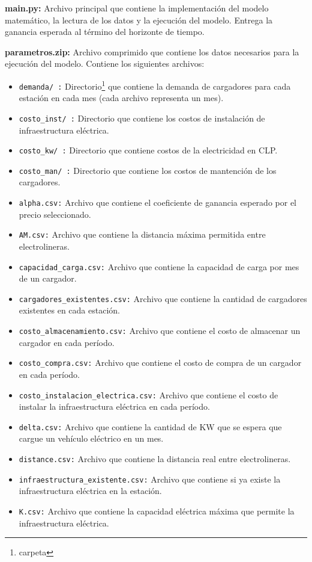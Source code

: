 \documentclass[letterpaper]{article}
\begin{document}
\begin{flushleft}
	\textbf{main.py:} Archivo principal que contiene la implementación del modelo matemático, la lectura de los datos y la ejecución del modelo. Entrega la ganancia esperada al término del horizonte de tiempo.

	\textbf{parametros.zip:} Archivo comprimido que contiene los datos necesarios para la ejecución del modelo. Contiene los siguientes archivos:

	\begin{itemize}
		\item \texttt{demanda/ :} Directorio\footnote{carpeta} que contiene la demanda de cargadores para cada estación en cada mes (cada archivo representa un mes).
		\item \texttt{costo\_inst/ :} Directorio que contiene los costos de instalación de infraestructura eléctrica.
		\item \texttt{costo\_kw/ :} Directorio que contiene costos de la electricidad en CLP.
		\item \texttt{costo\_man/ :} Directorio que contiene los costos de mantención de los cargadores.
		\item \texttt{alpha.csv:} Archivo que contiene el coeficiente de ganancia esperado por el precio seleccionado.
		\item \texttt{AM.csv:} Archivo que contiene la distancia máxima permitida entre electrolineras.
		\item \texttt{capacidad\_carga.csv:} Archivo que contiene la capacidad de carga por mes de un cargador.
		\item \texttt{cargadores\_existentes.csv:} Archivo que contiene la cantidad de cargadores existentes en cada estación.
		\item \texttt{costo\_almacenamiento.csv:} Archivo que contiene el costo de almacenar un cargador en cada período.
		\item \texttt{costo\_compra.csv:} Archivo que contiene el costo de compra de un cargador en cada período.
		\item \texttt{costo\_instalacion\_electrica.csv:} Archivo que contiene el costo de instalar la infraestructura eléctrica en cada período.
		\item \texttt{delta.csv:} Archivo que contiene la cantidad de KW que se espera que cargue un vehículo eléctrico en un mes.
		\item \texttt{distance.csv:} Archivo que contiene la distancia real entre electrolineras.
		\item \texttt{infraestructura\_existente.csv:} Archivo que contiene si ya existe la infraestructura eléctrica en la estación.
		\item \texttt{K.csv:} Archivo que contiene la capacidad eléctrica máxima que permite la infraestructura eléctrica.
	\end{itemize}


\end{flushleft}
\end{document}
